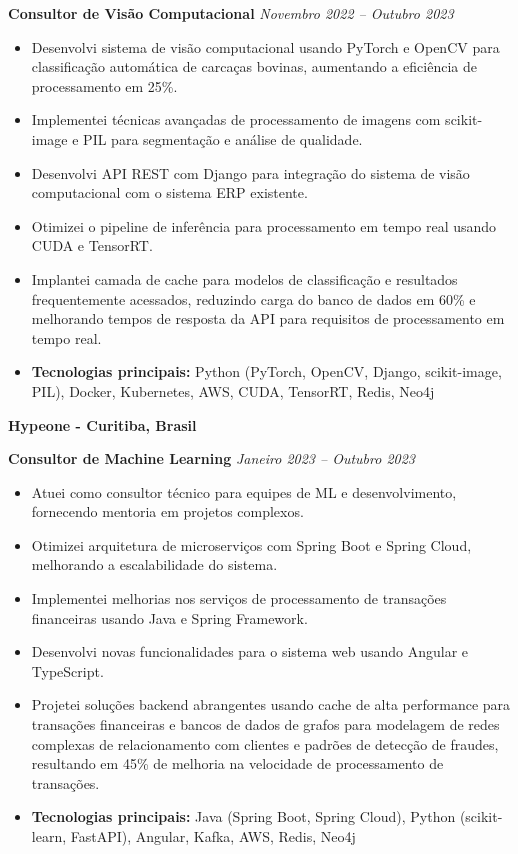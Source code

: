 \documentclass[12pt,a4paper,sans]{moderncv}
\begin{document}
\vspace{12pt}
\textbf{Consultor de Visão Computacional} \hfill \textit{Novembro 2022 -- Outubro 2023}
\begin{itemize}
    \item Desenvolvi sistema de visão computacional usando PyTorch e OpenCV para classificação automática de carcaças bovinas, aumentando a eficiência de processamento em 25\%.
    \item Implementei técnicas avançadas de processamento de imagens com scikit-image e PIL para segmentação e análise de qualidade.
    \item Desenvolvi API REST com Django para integração do sistema de visão computacional com o sistema ERP existente.
    \item Otimizei o pipeline de inferência para processamento em tempo real usando CUDA e TensorRT.
    \item Implantei camada de cache para modelos de classificação e resultados frequentemente acessados, reduzindo carga do banco de dados em 60\% e melhorando tempos de resposta da API para requisitos de processamento em tempo real.
    \item \textbf{Tecnologias principais:} Python (PyTorch, OpenCV, Django, scikit-image, PIL), Docker, Kubernetes, AWS, CUDA, TensorRT, Redis, Neo4j
\end{itemize}

\vspace{24pt}
\small{\textbf{Hypeone - Curitiba, Brasil}}
\vspace{3pt}

\textbf{Consultor de Machine Learning} \hfill \textit{Janeiro 2023 -- Outubro 2023}
\begin{itemize}
    \item Atuei como consultor técnico para equipes de ML e desenvolvimento, fornecendo mentoria em projetos complexos.
    \item Otimizei arquitetura de microserviços com Spring Boot e Spring Cloud, melhorando a escalabilidade do sistema.
    \item Implementei melhorias nos serviços de processamento de transações financeiras usando Java e Spring Framework.
    \item Desenvolvi novas funcionalidades para o sistema web usando Angular e TypeScript.
    \item Projetei soluções backend abrangentes usando cache de alta performance para transações financeiras e bancos de dados de grafos para modelagem de redes complexas de relacionamento com clientes e padrões de detecção de fraudes, resultando em 45\% de melhoria na velocidade de processamento de transações.
    \item \textbf{Tecnologias principais:} Java (Spring Boot, Spring Cloud), Python (scikit-learn, FastAPI), Angular, Kafka, AWS, Redis, Neo4j
\end{itemize}
\end{document}
